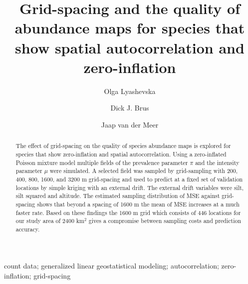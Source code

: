 \documentclass[review]{elsarticle}
\begin{document}
\begin{frontmatter}

\title{Grid-spacing and the quality of abundance maps for species that show spatial autocorrelation and zero-inflation}

\author[1]{Olga Lyashevska}

\author[2]{Dick J. Brus}

\author[1]{Jaap van der Meer}


\address[1]{Department of Marine Ecology\\
NIOZ Royal Netherlands Institute for Sea Research\\
P.O. Box 59 1790 AB Den Burg\\
Texel, The Netherlands}

\address[2]{Alterra, Wageningen University and Research Centre\\
P.O. Box 47, 6700AA\\
Wageningen, The Netherlands}

\begin{abstract}
The effect of grid-spacing on the quality of species abundance maps is explored for species that show zero-inflation and spatial autocorrelation.
Using a zero-inflated Poisson mixture model multiple fields of the prevalence parameter $\pi$ and the intensity parameter $\mu$ were simulated.
A selected field was sampled by grid-sampling with 200, 400, 800, 1600, and 3200 m grid-spacing and used to predict  at a fixed set of validation locations by simple kriging with an external drift.
The external drift variables were silt, silt squared and altitude.
The estimated sampling distribution of MSE against grid-spacing shows that beyond a spacing of 1600 m the mean of MSE increases at a much faster rate.
Based on these findings the 1600 m grid which consists of 446 locations for our study area of 2400 km$^{2}$ gives a compromise between sampling costs and prediction accuracy. 
\end{abstract}

\begin{keyword}
count data; generalized linear geostatistical modeling; autocorrelation; zero-inflation; grid-spacing
\end{keyword}

\end{frontmatter}
\end{document}
